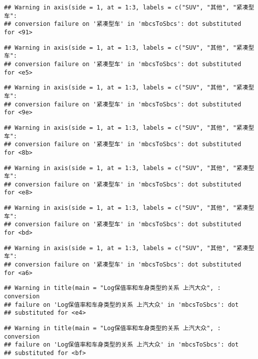 \documentclass[]{article}
\begin{document}
\begin{verbatim}
## Warning in axis(side = 1, at = 1:3, labels = c("SUV", "其他", "紧凑型车":
## conversion failure on '紧凑型车' in 'mbcsToSbcs': dot substituted for <91>
\end{verbatim}

\begin{verbatim}
## Warning in axis(side = 1, at = 1:3, labels = c("SUV", "其他", "紧凑型车":
## conversion failure on '紧凑型车' in 'mbcsToSbcs': dot substituted for <e5>
\end{verbatim}

\begin{verbatim}
## Warning in axis(side = 1, at = 1:3, labels = c("SUV", "其他", "紧凑型车":
## conversion failure on '紧凑型车' in 'mbcsToSbcs': dot substituted for <9e>
\end{verbatim}

\begin{verbatim}
## Warning in axis(side = 1, at = 1:3, labels = c("SUV", "其他", "紧凑型车":
## conversion failure on '紧凑型车' in 'mbcsToSbcs': dot substituted for <8b>
\end{verbatim}

\begin{verbatim}
## Warning in axis(side = 1, at = 1:3, labels = c("SUV", "其他", "紧凑型车":
## conversion failure on '紧凑型车' in 'mbcsToSbcs': dot substituted for <e8>
\end{verbatim}

\begin{verbatim}
## Warning in axis(side = 1, at = 1:3, labels = c("SUV", "其他", "紧凑型车":
## conversion failure on '紧凑型车' in 'mbcsToSbcs': dot substituted for <bd>
\end{verbatim}

\begin{verbatim}
## Warning in axis(side = 1, at = 1:3, labels = c("SUV", "其他", "紧凑型车":
## conversion failure on '紧凑型车' in 'mbcsToSbcs': dot substituted for <a6>
\end{verbatim}

\begin{verbatim}
## Warning in title(main = "Log保值率和车身类型的关系 上汽大众", : conversion
## failure on 'Log保值率和车身类型的关系 上汽大众' in 'mbcsToSbcs': dot
## substituted for <e4>
\end{verbatim}

\begin{verbatim}
## Warning in title(main = "Log保值率和车身类型的关系 上汽大众", : conversion
## failure on 'Log保值率和车身类型的关系 上汽大众' in 'mbcsToSbcs': dot
## substituted for <bf>
\end{verbatim}
\end{document}
